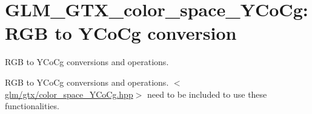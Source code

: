 \hypertarget{group__gtx__color__space__YCoCg}{\section{\-G\-L\-M\-\_\-\-G\-T\-X\-\_\-color\-\_\-space\-\_\-\-Y\-Co\-Cg\-: \-R\-G\-B to \-Y\-Co\-Cg conversion}
\label{group__gtx__color__space__YCoCg}
}


\-R\-G\-B to \-Y\-Co\-Cg conversions and operations.  


\-R\-G\-B to \-Y\-Co\-Cg conversions and operations. $<$\hyperlink{color__space__YCoCg_8hpp}{glm/gtx/color\-\_\-space\-\_\-\-Y\-Co\-Cg.\-hpp}$>$ need to be included to use these functionalities. 